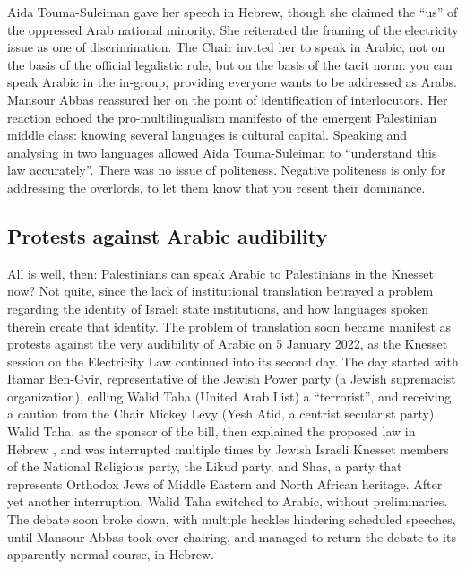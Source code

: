 \documentclass[output=paper,arabicfont]{langscibook}
\begin{document}
Aida Touma-Suleiman gave her speech in Hebrew, though she claimed the “us” of the oppressed Arab national minority. She reiterated the framing of the electricity issue as one of discrimination. The Chair invited her to speak in Arabic, not on the basis of the official legalistic rule, but on the basis of the tacit norm: you can speak Arabic in the in-group, providing everyone wants to be addressed as Arabs. Mansour Abbas reassured her on the point of identification of interlocutors. Her reaction echoed the pro-multilingualism manifesto of the emergent Palestinian middle class: knowing several languages is cultural capital. Speaking and analysing in two languages allowed Aida Touma-Suleiman to “understand this law accurately”. There was no issue of politeness. Negative politeness is only for addressing the overlords, to let them know that you resent their dominance.

\subsection{Protests against Arabic audibility}

All is well, then: Palestinians can speak Arabic to Palestinians in the Knesset now? Not quite, since the lack of institutional translation betrayed a problem regarding the identity of Israeli state institutions, and how languages spoken therein create that identity. The problem of translation soon became manifest as protests against the very audibility of Arabic on 5 January 2022, as the Knesset session on the Electricity Law continued into its second day. The day started with Itamar Ben-Gvir, representative of the Jewish Power party (a Jewish supremacist organization), calling Walid Taha (United Arab List) a “terrorist”, and receiving a caution from the Chair Mickey Levy (Yesh Atid, a centrist secularist party). Walid Taha, as the sponsor of the bill, then explained the proposed law in Hebrew \citep[82–89]{knesset2022-a}, and was interrupted multiple times by Jewish Israeli Knesset members of the National Religious party, the Likud party, and Shas, a party that represents Orthodox Jews of Middle Eastern and North African heritage. After yet another interruption, Walid Taha switched to Arabic, without preliminaries. The debate soon broke down, with multiple heckles hindering scheduled speeches, until Mansour Abbas took over chairing, and managed to return the debate to its apparently normal course, in Hebrew.\\
\end{document}
